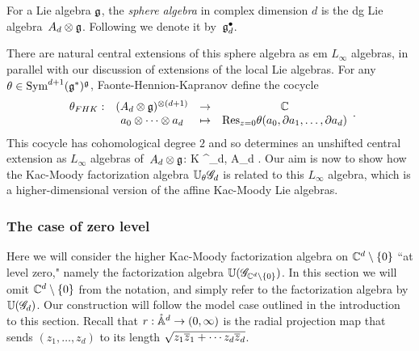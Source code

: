 \begin{dfn}
For a Lie algebra $\mathfrak g$, the {\em sphere algebra} in complex dimension $d$ is the dg Lie algebra~$A_d \otimes \mathfrak g$.
Following \cite{FHK} we denote it by~$\mathfrak g^\bullet_d$.
\end{dfn}

There are natural central extensions of this sphere algebra as {em $L_\infty$ algebras},
in parallel with our discussion of extensions of the local Lie algebras.
For any $\theta \in {\rm Sym}^{d+1}(\mathfrak g^*)^\mathfrak g$, Faonte-Hennion-Kapranov define the cocycle
\[
\label{fhk cocycle}
\begin{array}{cccc}
\theta_{FHK} : & (A_d \otimes \mathfrak g)^{\otimes (d+1)} & \to & \mathbb C\\ 
& a_0 \otimes \cdots \otimes a_d & \mapsto & {\rm Res}_{z=0} \theta(a_0,\partial a_1,\ldots,\partial a_d)
\end{array}.
\]
This cocycle has cohomological degree $2$ and so determines an unshifted central extension as $L_\infty$ algebras of~$A_d \otimes \mathfrak g$:
\beqn\label{gdt}
\CC \cdot K \to \widetilde{\fg}^\bullet_{d, \theta} \to A_d \tensor \fg .
\eeqn
Our aim is now to show how the Kac-Moody factorization algebra $\mathbb U_\theta \mathscr G_d$ is related to this $L_\infty$ algebra,
which is a higher-dimensional version of the affine Kac-Moody Lie algebras. 

%

\subsubsection{The case of zero level}

Here we will consider the higher Kac-Moody factorization algebra on $\mathbb C^d \setminus \{0\}$ ``at level zero," namely the factorization algebra $\mathbb U(\mathscr G_{\mathbb C^d \setminus\{0\}})$.
In this section we will omit $\mathbb C^d \setminus \{0\}$ from the notation, and simply refer to the factorization algebra by $\mathbb U(\mathscr G_d)$. 
Our construction will follow the model case outlined in the introduction to this section.
Recall that $r: \mathring{\mathbb A}^d \to (0,\infty)$ is the radial projection map that sends $(z_1,\ldots,z_d)$ to its length $\sqrt{z_1\overline{z}_1 + \cdots z_d \overline{z}_d}$.

